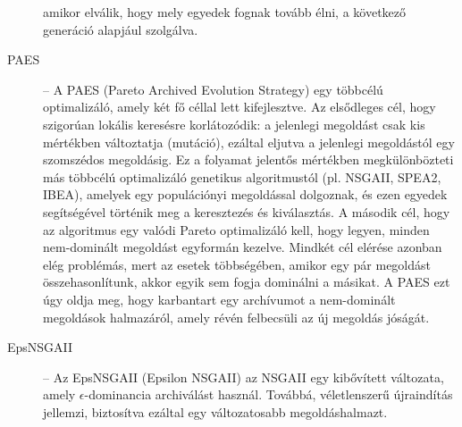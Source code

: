 \begin{description}
            amikor elválik, hogy mely egyedek fognak tovább élni, a következő generáció alapjául szolgálva.
      \item[PAES] -- A PAES (Pareto Archived Evolution Strategy) \cite{knowles1999pareto} egy többcélú optimalizáló, amely két fő céllal lett kifejlesztve.
            Az elsődleges cél, hogy szigorúan lokális keresésre korlátozódik: a jelenlegi megoldást csak kis mértékben változtatja (mutáció),
            ezáltal eljutva a jelenlegi megoldástól egy szomszédos megoldásig. Ez a folyamat jelentős mértékben megkülönbözteti más többcélú optimalizáló genetikus algoritmustól (pl. NSGAII, SPEA2, IBEA),
            amelyek egy populációnyi megoldással dolgoznak, és ezen egyedek segítségével történik meg a keresztezés és kiválasztás.
            A második cél, hogy az algoritmus egy valódi Pareto optimalizáló kell, hogy legyen, minden nem-dominált megoldást egyformán kezelve.
            Mindkét cél elérése azonban elég problémás, mert az esetek többségében, amikor egy pár megoldást összehasonlítunk, akkor egyik sem fogja dominálni a másikat.
            A PAES ezt úgy oldja meg, hogy karbantart egy archívumot a nem-dominált megoldások halmazáról, amely révén felbecsüli az új megoldás jóságát.
      \item[EpsNSGAII] -- Az EpsNSGAII (Epsilon NSGAII) \cite{ventresca2018bi} az NSGAII egy kibővített változata, amely $\epsilon$-dominancia archiválást használ.
            Továbbá, véletlenszerű újraindítás jellemzi, biztosítva ezáltal egy változatosabb megoldáshalmazt.
\end{description}
